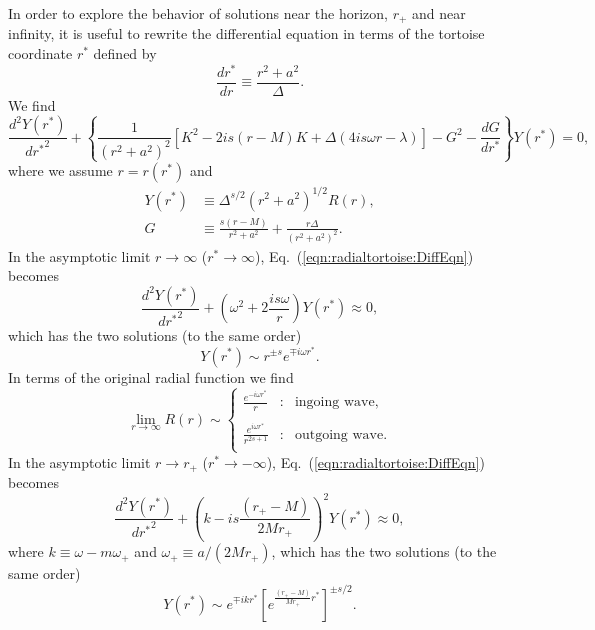\documentclass[11pt]{article}
\begin{document}
In order to explore the behavior of solutions near the horizon, $r_+$
and near infinity, it is useful to rewrite the differential equation in
terms of the tortoise coordinate $r^*$ defined by
\begin{equation}\label{eqn:tortoise_coord:DiffEqn}
  \frac{dr^*}{dr} \equiv \frac{r^2+a^2}{\Delta}.
\end{equation}
We find
\begin{equation}
\frac{d^2Y(r^*)}{d{r^*}^2} +\left\{\frac1{(r^2+a^2)^2}\left[
    K^2 -2is(r-M)K + \Delta(4is\omega{r} - \lambda)\right]
    - G^2 - \frac{dG}{dr^*}\right\}Y(r^*) = 0,
\end{equation}
where we assume $r=r(r^*)$ and
\begin{align}\label{eqn:radialtortoise:DiffEqn}
  Y(r^*) &\equiv \Delta^{s/2}(r^2+a^2)^{1/2}R(r), \\
  G &\equiv \frac{s(r-M)}{r^2+a^2} + \frac{r\Delta}{(r^2+a^2)^2}.
\end{align}
In the asymptotic limit $r\to\infty$ ($r^*\to\infty$),
Eq.~(\ref{eqn:radialtortoise:DiffEqn}) becomes
\begin{equation}
\frac{d^2Y(r^*)}{d{r^*}^2} + \left(\omega^2 
     + 2\frac{is\omega}{r}\right)Y(r^*) \approx 0,
\end{equation}
which has the two solutions (to the same order)
\begin{equation}
   Y(r^*) \sim r^{\pm{s}}e^{\mp{i}\omega{r^*}}.
\end{equation}
In terms of the original radial function we find
\begin{equation}
  \lim_{r\to\infty}R(r) \sim \left\{\begin{array}{lcl}
      \frac{e^{-i\omega{r^*}}}{r} &:& \mbox{ingoing wave}, \\ \\
      \frac{e^{i\omega{r^*}}}{r^{2s+1}} &:& \mbox{outgoing wave}. \\
   \end{array}\right.
\end{equation}
In the asymptotic limit $r\to r_+$ ($r^*\to-\infty$),
Eq.~(\ref{eqn:radialtortoise:DiffEqn}) becomes
\begin{equation}
\frac{d^2Y(r^*)}{d{r^*}^2} + \left(k 
    - is\frac{(r_+-M)}{2Mr_+}\right)^2Y(r^*) \approx 0,
\end{equation}
where $k\equiv\omega-m\omega_+$ and $\omega_+\equiv a/(2Mr_+)$,
which has the two solutions (to the same order)
\begin{equation}\label{eqn:rplusYlimit}
   Y(r^*) \sim e^{\mp{i}k{r^*}}\left[e^{\frac{(r_+-M)}{Mr_+}r^*}\right]^{\pm{s}/2}.
\end{equation}
\end{document}
